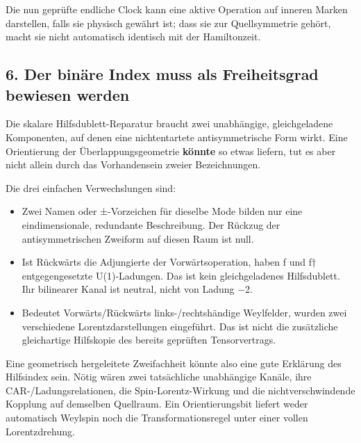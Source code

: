 Die nun geprüfte endliche Clock kann eine aktive Operation auf inneren
Marken darstellen, falls sie physisch gewährt ist; dass sie zur
Quellsymmetrie gehört, macht sie nicht automatisch identisch mit der
Hamiltonzeit.

\subsection{6. Der binäre Index muss als Freiheitsgrad bewiesen
werden}\label{der-binuxe4re-index-muss-als-freiheitsgrad-bewiesen-werden}

Die skalare Hilfsdublett-Reparatur braucht zwei unabhängige,
gleichgeladene Komponenten, auf denen eine nichtentartete
antisymmetrische Form wirkt. Eine Orientierung der Überlappungsgeometrie
\textbf{könnte} so etwas liefern, tut es aber nicht allein durch das
Vorhandensein zweier Bezeichnungen.

Die drei einfachen Verwechslungen sind:

\begin{itemize}
\tightlist
\item
  Zwei Namen oder ±-Vorzeichen für dieselbe Mode bilden nur eine
  eindimensionale, redundante Beschreibung. Der Rückzug der
  antisymmetrischen Zweiform auf diesen Raum ist null.
\item
  Ist Rückwärts die Adjungierte der Vorwärtsoperation, haben f und f†
  entgegengesetzte U(1)-Ladungen. Das ist kein gleichgeladenes
  Hilfsdublett. Ihr bilinearer Kanal ist neutral, nicht von Ladung −2.
\item
  Bedeutet Vorwärts/Rückwärts links-/rechtshändige Weylfelder, wurden
  zwei verschiedene Lorentzdarstellungen eingeführt. Das ist nicht die
  zusätzliche gleichartige Hilfskopie des bereits geprüften
  Tensorvertrags.
\end{itemize}

Eine geometrisch hergeleitete Zweifachheit könnte also eine gute
Erklärung des Hilfsindex sein. Nötig wären zwei tatsächliche unabhängige
Kanäle, ihre CAR-/Ladungsrelationen, die Spin-Lorentz-Wirkung und die
nichtverschwindende Kopplung auf demselben Quellraum. Ein
Orientierungsbit liefert weder automatisch Weylspin noch die
Transformationsregel unter einer vollen Lorentzdrehung.

